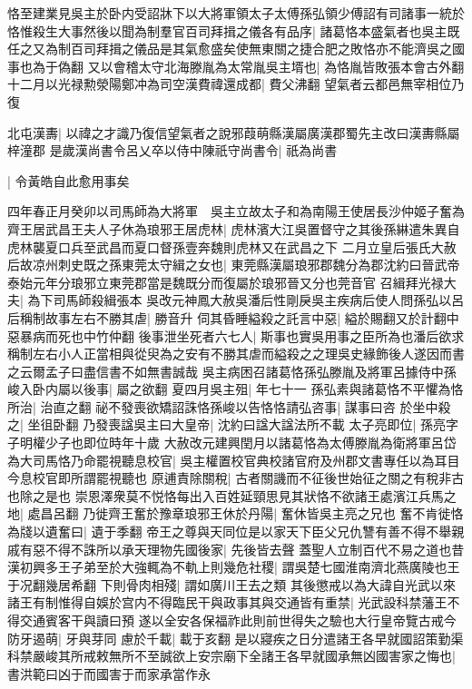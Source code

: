 恪至建業見吳主於卧内受詔牀下以大將軍領太子太傅孫弘領少傅詔有司諸事一統於恪惟殺生大事然後以聞為制羣官百司拜揖之儀各有品序|{
	諸葛恪本盛氣者也吳主既任之又為制百司拜揖之儀品是其氣愈盛矣使無東關之捷合肥之敗恪亦不能濟吳之國事也為于偽翻}
又以會稽太守北海滕胤為太常胤吳主壻也|{
	為恪胤皆敗張本會古外翻}
十二月以光禄勲滎陽鄭冲為司空漢費禕還成都|{
	費父沸翻}
望氣者云都邑無宰相位乃復

北屯漢夀|{
	以禕之才識乃復信望氣者之說邪葭萌縣漢屬廣漢郡蜀先主改曰漢夀縣屬梓潼郡}
是歲漢尚書令呂乂卒以侍中陳祇守尚書令|{
	祇為尚書}


|{
	令黃皓自此愈用事矣}


四年春正月癸卯以司馬師為大將軍　吳主立故太子和為南陽王使居長沙仲姬子奮為齊王居武昌王夫人子休為琅邪王居虎林|{
	虎林濱大江吳置督守之其後孫綝遣朱異自虎林襲夏口兵至武昌而夏口督孫壹奔魏則虎林又在武昌之下}
二月立皇后張氏大赦后故凉州刺史既之孫東莞太守緝之女也|{
	東莞縣漢屬琅邪郡魏分為郡沈約曰晉武帝泰始元年分琅邪立東莞郡當是魏既分而復屬於琅邪晉又分也莞音官}
召緝拜光禄大夫|{
	為下司馬師殺緝張本}
吳改元神鳳大赦吳潘后性剛戾吳主疾病后使人問孫弘以呂后稱制故事左右不勝其虐|{
	勝音升}
伺其昏睡縊殺之託言中惡|{
	縊於賜翻又於計翻中惡暴病而死也中竹仲翻}
後事泄坐死者六七人|{
	斯事也實吳用事之臣所為也潘后欲求稱制左右小人正當相與從臾為之安有不勝其虐而縊殺之之理吳史緣飾後人遂因而書之云爾孟子曰盡信書不如無書誠哉}
吳主病困召諸葛恪孫弘滕胤及將軍呂據侍中孫峻入卧内屬以後事|{
	屬之欲翻}
夏四月吳主殂|{
	年七十一}
孫弘素與諸葛恪不平懼為恪所治|{
	治直之翻}
祕不發喪欲矯詔誅恪孫峻以告恪恪請弘咨事|{
	謀事曰咨}
於坐中殺之|{
	坐徂卧翻}
乃發喪諡吳主曰大皇帝|{
	沈約曰諡大諡法所不載}
太子亮即位|{
	孫亮字子明權少子也即位時年十歲}
大赦改元建興閏月以諸葛恪為太傅滕胤為衛將軍呂岱為大司馬恪乃命罷視聽息校官|{
	吳主權置校官典校諸官府及州郡文書專任以為耳目今息校官即所謂罷視聽也}
原逋責除關稅|{
	古者關譏而不征後世始征之關之有稅非古也除之是也}
崇恩澤衆莫不悦恪每出入百姓延頸思見其狀恪不欲諸王處濱江兵馬之地|{
	處昌呂翻}
乃徙齊王奮於豫章琅邪王休於丹陽|{
	奮休皆吳主亮之兄也}
奮不肯徙恪為牋以遺奮曰|{
	遺于季翻}
帝王之尊與天同位是以家天下臣父兄仇讐有善不得不舉親戚有惡不得不誅所以承天理物先國後家|{
	先後皆去聲}
蓋聖人立制百代不易之道也昔漢初興多王子弟至於大強輒為不軌上則幾危社稷|{
	謂吳楚七國淮南濟北燕廣陵也王于况翻幾居希翻}
下則骨肉相殘|{
	謂如廣川王去之類}
其後懲戒以為大諱自光武以來諸王有制惟得自娛於宫内不得臨民干與政事其與交通皆有重禁|{
	光武設科禁藩王不得交通賓客干與讀曰預}
遂以全安各保福祚此則前世得失之驗也大行皇帝覽古戒今防牙遏萌|{
	牙與芽同}
慮於千載|{
	載于亥翻}
是以寢疾之日分遣諸王各早就國詔策勤渠科禁嚴峻其所戒敕無所不至誠欲上安宗廟下全諸王各早就國承無凶國害家之悔也|{
	書洪範曰凶于而國害于而家承當作永}
